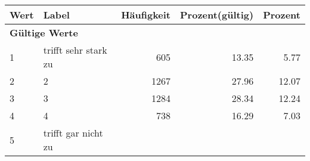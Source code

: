      \begin{longtable}{lXrrr}
     \toprule
     \textbf{Wert} & \textbf{Label} & \textbf{Häufigkeit} & \textbf{Prozent(gültig)} & \textbf{Prozent} \\
     \endhead
     \midrule
     \multicolumn{5}{l}{\textbf{Gültige Werte}}\\

     1 &
     \multicolumn{1}{X}{ trifft sehr stark zu   } &


       \num{605} &
       \num[round-mode=places,round-precision=2]{13,35} &
         \num[round-mode=places,round-precision=2]{5,77} \\

     2 &
     \multicolumn{1}{X}{ 2   } &


       \num{1267} &
       \num[round-mode=places,round-precision=2]{27,96} &
         \num[round-mode=places,round-precision=2]{12,07} \\

     3 &
     \multicolumn{1}{X}{ 3   } &


       \num{1284} &
       \num[round-mode=places,round-precision=2]{28,34} &
         \num[round-mode=places,round-precision=2]{12,24} \\

     4 &
     \multicolumn{1}{X}{ 4   } &


       \num{738} &
       \num[round-mode=places,round-precision=2]{16,29} &
         \num[round-mode=places,round-precision=2]{7,03} \\

     5 &
     \multicolumn{1}{X}{ trifft gar nicht zu   } &



\end{longtable}

